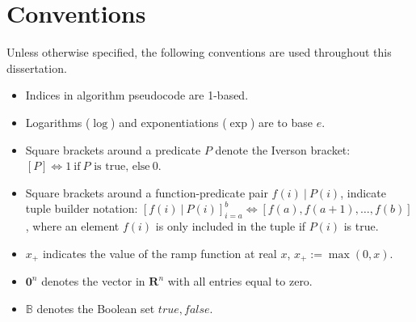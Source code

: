 \chapter*{Conventions}
Unless otherwise specified, the following conventions are used throughout this dissertation.

\begin{itemize}
  \item Indices in algorithm pseudocode are 1-based.
  \item Logarithms ($\log$) and exponentiations ($\exp$) are to base $e$.
  \item Square brackets around a predicate $P$ denote the Iverson bracket: $\left[P\right] \Leftrightarrow 1\ \mbox{if}\ P \mbox{ is true, else}\ 0$.
  \item Square brackets around a function-predicate pair $f(i)~|~P(i)$, indicate tuple builder notation: $\left[f(i)~|~P(i)\right]_{i=a}^b \Leftrightarrow \left[ f(a), f(a+1), \dots, f(b) \right]$, where an element $f(i)$ is only included in the tuple if $P(i)$ is true.
  \item $x_+$ indicates the value of the ramp function at real $x$, $x_+ := \max(0, x)$.
  \item $\mathbf{0}^n$ denotes the vector in $\mathbf{R}^n$ with all entries equal to zero.
  \item $\mathbb{B}$ denotes the Boolean set ${true, false}$.
\end{itemize}
